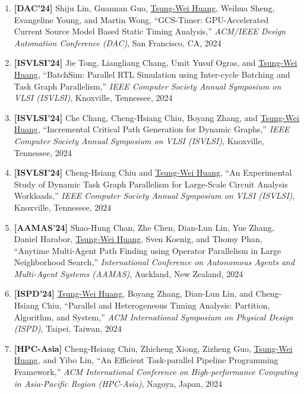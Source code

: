 \documentclass[A4,11pt]{article}
\begin{document}
\begin{enumerate}
    \item \textbf{[DAC'24]} Shiju Lin, Guannan Guo, \underline{Tsung-Wei Huang}, Weihua Sheng, Evangeline Young, and Martin Wong, ``GCS-Timer: GPU-Accelerated Current Source Model Based Static Timing Analysis,'' \textit{ACM/IEEE Design Automation Conference (DAC)}, San Francisco, CA, 2024

    \item \textbf{[ISVLSI'24]} Jie Tong, Liangliang Chang, Umit Yusuf Ogras, and \underline{Tsung-Wei Huang}, ``BatchSim: Parallel RTL Simulation using Inter-cycle Batching and Task Graph Parallelism,'' \textit{IEEE Computer Society Annual Symposium on VLSI (ISVLSI)}, Knoxville, Tennessee, 2024

    \item \textbf{[ISVLSI'24]} Che Chang, Cheng-Hsiang Chiu, Boyang Zhang, and \underline{Tsung-Wei Huang}, ``Incremental Critical Path Generation for Dynamic Graphs,'' \textit{IEEE Computer Society Annual Symposium on VLSI (ISVLSI)}, Knoxville, Tennessee, 2024

    \item \textbf{[ISVLSI'24]} Cheng-Hsiang Chiu and \underline{Tsung-Wei Huang}, ``An Experimental Study of Dynamic Task Graph Parallelism for Large-Scale Circuit Analysis Workloads,'' \textit{IEEE Computer Society Annual Symposium on VLSI (ISVLSI)}, Knoxville, Tennessee, 2024

    \item \textbf{[AAMAS'24]} Shao-Hung Chan, Zhe Chen, Dian-Lun Lin, Yue Zhang, Daniel Harabor, \underline{Tsung-Wei Huang}, Sven Koenig, and Thomy Phan, ``Anytime Multi-Agent Path Finding using Operator Parallelism in Large Neighborhood Search,'' \textit{International Conference on Autonomous Agents and Multi-Agent Systems (AAMAS)}, Auckland, New Zealand, 2024

    \item \textbf{[ISPD'24]} \underline{Tsung-Wei Huang}, Boyang Zhang, Dian-Lun Lin, and Cheng-Hsiang Chiu, ``Parallel and Heterogeneous Timing Analysis: Partition, Algorithm, and System,'' \textit{ACM International Symposium on Physical Design (ISPD)}, Taipei, Taiwan, 2024

    \item \textbf{[HPC-Asia]} Cheng-Hsiang Chiu, Zhicheng Xiong, Zizheng Guo, \underline{Tsung-Wei Huang}, and Yibo Lin, ``An Efficient Task-parallel Pipeline Programming Framework,'' \textit{ACM International Conference on High-performance Computing in Asia-Pacific Region (HPC-Asia)}, Nagoya, Japan, 2024


\end{enumerate}
\end{document}
